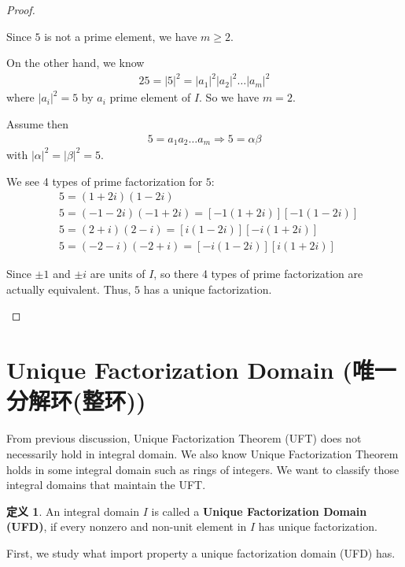 \documentclass[utf8]{ctexbook}
\theoremstyle{definition}
\newtheorem{protodefinition}{定义}[section]
\newenvironment{definition}
   {\colorlet{shadecolor}{black!15}\begin{shaded}\begin{protodefinition}}
   {\end{protodefinition}\end{shaded}}
\begin{document}
\begin{proof}
\begin{enumerate}
\begin{itemize}
{Since $5$ is not a prime element, we have $m \geq 2$.

On the other hand, we know
\begin{align*}
25 = |5|^2 = |a_1|^2 |a_2|^2 \ldots |a_m|^2
\end{align*}
where $|a_i|^2 =5$ by $a_i$ prime element of $I$. So we have $m=2$.

Assume then
\begin{align*}
5 = a_1 a_2 \ldots a_m \Longrightarrow 5 = \alpha \beta
\end{align*} 
with $|\alpha|^2 =  | \beta |^2 = 5$.

We see 4 types of prime factorization for $5$:
\begin{align*}
& 5 = (1 + 2i) (1 - 2i) \\
& 5 = (-1 - 2i) (-1 + 2i) = [ -1 (1 + 2i) ] [-1 (1 - 2i ) ] \\
& 5 = ( 2 + i ) ( 2 - i) = [ i (1- 2i) ] [ -i ( 1 + 2i) ]\\
& 5 = ( -2 - i ) (-2 + i) = [ -i ( 1 - 2i) ] [ i ( 1 + 2i ) ]
\end{align*} 

Since $\pm 1$ and $\pm i$ are units of $I$, so there 4 types of prime factorization are actually equivalent. Thus, $5$ has a unique factorization.
}
\end{itemize}

\end{enumerate}


\end{proof}

\section{Unique Factorization Domain (唯一分解环(整环))}

From previous discussion, Unique Factorization Theorem (UFT) does not necessarily hold in integral domain. We also know Unique Factorization Theorem holds in some integral domain such as rings of integers. We want to classify those integral domains that maintain the UFT.

\begin{definition}
An integral domain $I$ is called a \textbf{Unique Factorization Domain (UFD)}, if every nonzero and non-unit element in $I$ has unique factorization.
\end{definition}

First, we study what import property a unique factorization domain (UFD) has.
\end{document}
